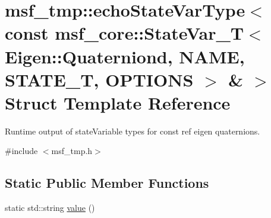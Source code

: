 \hypertarget{structmsf__tmp_1_1echoStateVarType_3_01const_01msf__core_1_1StateVar__T_3_01Eigen_1_1Quaterniond7114362e0351fe52a4a010b178818803}{\section{msf\-\_\-tmp\-:\-:echo\-State\-Var\-Type$<$ const msf\-\_\-core\-:\-:State\-Var\-\_\-\-T$<$ Eigen\-:\-:Quaterniond, N\-A\-M\-E, S\-T\-A\-T\-E\-\_\-\-T, O\-P\-T\-I\-O\-N\-S $>$ \& $>$ Struct Template Reference}
\label{structmsf__tmp_1_1echoStateVarType_3_01const_01msf__core_1_1StateVar__T_3_01Eigen_1_1Quaterniond7114362e0351fe52a4a010b178818803}
}


Runtime output of state\-Variable types for const ref eigen quaternions.  




{\ttfamily \#include $<$msf\-\_\-tmp.\-h$>$}

\subsection*{Static Public Member Functions}
\begin{DoxyCompactItemize}
\item 
static std\-::string \hyperlink{structmsf__tmp_1_1echoStateVarType_3_01const_01msf__core_1_1StateVar__T_3_01Eigen_1_1Quaterniond7114362e0351fe52a4a010b178818803_a8cee5c54b7d3a49c12842a6388969554}{value} ()
\end{DoxyCompactItemize}


